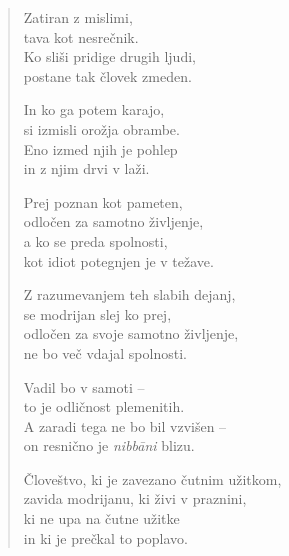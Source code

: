 \clearpage
\begin{verse}

Zatiran z mislimi,\\
tava kot nesrečnik.\\
Ko sliši pridige drugih ljudi,\\
postane tak človek zmeden.

In ko ga potem karajo,\\
si izmisli orožja obrambe.\\
Eno izmed njih je pohlep\\
in z njim drvi v laži.

Prej poznan kot pameten,\\
odločen za samotno življenje,\\
a ko se preda spolnosti,\\
kot idiot potegnjen je v težave.

Z razumevanjem teh slabih dejanj,\\
se modrijan slej ko prej,\\
odločen za svoje samotno življenje,\\
ne bo več vdajal spolnosti.

Vadil bo v samoti --\\
to je odličnost plemenitih.\\
A zaradi tega ne bo bil vzvišen --\\
on resnično je \emph{nibbāni} blizu.

Človeštvo, ki je zavezano čutnim užitkom,\\
zavida modrijanu, ki živi v praznini,\\
ki ne upa na čutne užitke\\
in ki je prečkal to poplavo.

\end{verse}

